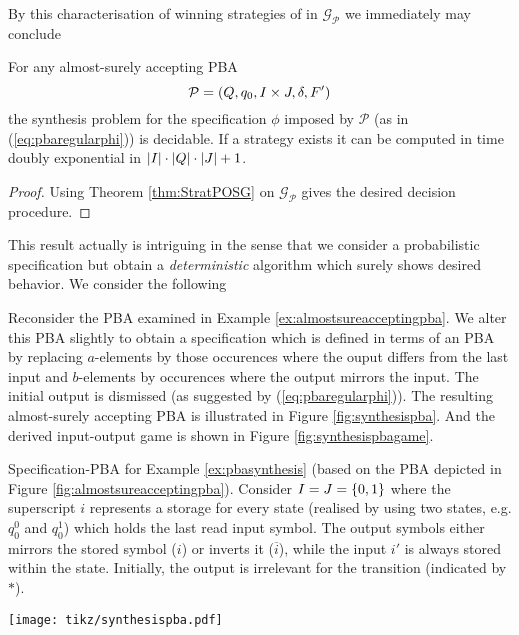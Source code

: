By this characterisation of winning strategies of \eve{} in 
$\mathcal{G}_{\mathcal{P}}$ we immediately may conclude
\begin{theorem}
  For any almost-surely accepting \ac{PBA} 
  \begin{equation*}
    \mathcal{P} = \left(Q, q_{0}, I\times J, \delta, F'\right)
  \end{equation*}
  the synthesis problem for the specification $\phi$ imposed by $\mathcal{P}$
  (as in (\ref{eq:pbaregularphi})) is decidable. If a strategy exists it can
  be computed in time doubly exponential in
  $\left\vert{I}\right\vert\cdot \left\vert{Q}\right\vert\cdot \left\vert{J}\right\vert + 1$.
  \label{thm:pbastratpomdpsynthesis}
\end{theorem}
\begin{proof}
  Using Theorem \ref{thm:StratPOSG} on $\mathcal{G}_{\mathcal{P}}$ gives the
  desired decision procedure.
\end{proof}

This result actually is intriguing in the sense that we consider a
probabilistic specification but obtain a \emph{deterministic} algorithm which
surely shows desired behavior. We consider the following
\begin{example}
  Reconsider the \ac{PBA} examined in Example \ref{ex:almostsureacceptingpba}.
  We alter this \ac{PBA} slightly to obtain a specification which is defined in
  terms of an \ac{PBA} by replacing $a$-elements by those occurences where the
  ouput differs from the last input and $b$-elements by occurences where the 
  output mirrors the input. The initial output is dismissed (as suggested by
  (\ref{eq:pbaregularphi})). The resulting almost-surely accepting \ac{PBA} is
  illustrated in Figure \ref{fig:synthesispba}. And the derived input-output 
  game is shown in Figure \ref{fig:synthesispbagame}.
  \label{ex:pbasynthesis}
\end{example}
\begin{drawing}
  \caption{
    Specification-PBA for Example \ref{ex:pbasynthesis} (based on the PBA 
    depicted in Figure \ref{fig:almostsureacceptingpba}). Consider 
    $I = J =\left\{0,1\right\}$ where the superscript $i$ represents a storage for every
    state (realised by using two states, e.g. $q_{0}^{0}$ and $q_{0}^{1}$) 
    which holds the last read input symbol. The output symbols either mirrors 
    the stored symbol ($i$) or inverts it ($\overline{i}$), while the input 
    $i'$ is always stored within the state. Initially, the output is irrelevant 
    for the transition (indicated by $*$).
  }
  \label{fig:synthesispba}
  \begin{center}
    \texttt{[image: tikz/synthesispba.pdf]}
  \end{center}
\end{drawing}

